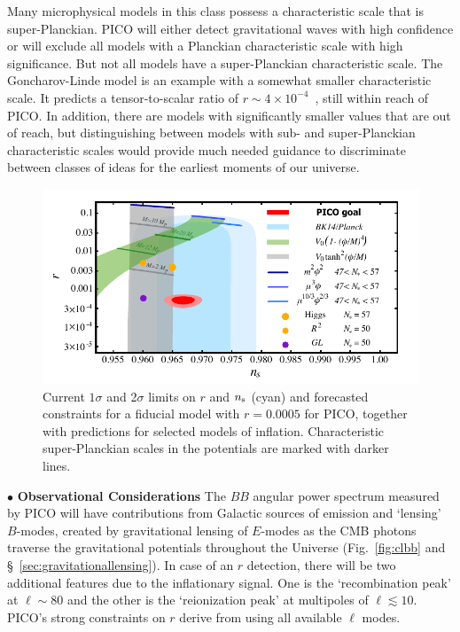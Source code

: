\documentclass[PICOReport.tex]{subfiles}
\begin{document}
Many microphysical models in this class possess a characteristic scale that is super-Planckian. PICO will either detect gravitational waves with high confidence or will exclude all models with a Planckian characteristic scale with high significance. But not all models have a super-Planckian characteristic scale. The Goncharov-Linde model is an example with a somewhat smaller characteristic scale. It predicts a tensor-to-scalar ratio of $r\sim 4\times 10^{-4}$~\cite{Goncharov:1983mw}, still within reach of PICO. In addition, there are models with significantly smaller values that are out of reach, but distinguishing between models with sub- and super-Planckian characteristic scales would provide much needed guidance to discriminate between classes of ideas for the earliest moments of our universe.

\begin{figure}[!thb]
\parbox{4.5in}{\centerline{
\includegraphics[width=4.5in]{images/nsrlabeledrp0005_PICOv4p1.pdf}}}
\parbox{1.8in}{
\caption{\captiontext  Current $1\sigma$ and 2$\sigma$ limits on $r$ and $n_{\rm s}$ (cyan) and forecasted constraints for a fiducial model with $r = 0.0005$ for PICO, together with predictions for selected models of inflation. Characteristic super-Planckian scales in the potentials are marked with darker lines. }
\label{fig:nsr}}
\vspace{-0.1in}
\end{figure}

\noindent$\bullet$ {\bf Observational Considerations} \hspace{0.1in} 
The $BB$ angular power spectrum measured by PICO will have contributions from Galactic sources of emission and `lensing' $B$-modes, created by gravitational lensing of $E$-modes as the CMB photons traverse the gravitational potentials throughout the Universe (Fig.~\ref{fig:clbb} and \S~\ref{sec:gravitationallensing}). In case of an $r$ detection, there will be two additional features due to the inflationary signal. One is the `recombination peak' at $\ell \sim 80$ and the other is the `reionization peak' at multipoles of $\ell\lesssim 10$. PICO's strong constraints on $r$ derive from using all available $\ell$ modes.
\end{document}
